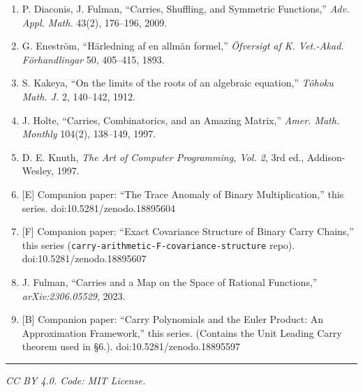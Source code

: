 \documentclass[
  11pt,
]{article}
\providecommand{\tightlist}{%
  \setlength{\itemsep}{0pt}\setlength{\parskip}{0pt}}
\begin{document}
\begin{enumerate}
\def\labelenumi{\arabic{enumi}.}
\tightlist
\item
  P. Diaconis, J. Fulman, ``Carries, Shuffling, and Symmetric Functions,''
  \emph{Adv. Appl. Math.} 43(2), 176--196, 2009.
\item
  G. Eneström, ``Härledning af en allmän formel,'' \emph{Öfversigt af K.
  Vet.-Akad. Förhandlingar} 50, 405--415, 1893.
\item
  S. Kakeya, ``On the limits of the roots of an algebraic equation,''
  \emph{Tôhoku Math. J.} 2, 140--142, 1912.
\item
  J. Holte, ``Carries, Combinatorics, and an Amazing Matrix,'' \emph{Amer. Math.
  Monthly} 104(2), 138--149, 1997.
\item
  D. E. Knuth, \emph{The Art of Computer Programming, Vol. 2}, 3rd ed.,
  Addison-Wesley, 1997.
\item
  {[}E{]} Companion paper: ``The Trace Anomaly of Binary Multiplication,'' this
  series. doi:10.5281/zenodo.18895604
\item
  {[}F{]} Companion paper: ``Exact Covariance Structure of Binary Carry
  Chains,'' this series (\texttt{carry-arithmetic-F-covariance-structure} repo).
  doi:10.5281/zenodo.18895607
\item
  J. Fulman, ``Carries and a Map on the Space of Rational Functions,''
  \emph{arXiv:2306.05529}, 2023.
\item
  {[}B{]} Companion paper: ``Carry Polynomials and the Euler Product: An
  Approximation Framework,'' this series. (Contains the Unit Leading Carry
  theorem used in §6.). doi:10.5281/zenodo.18895597
\end{enumerate}

\begin{center}\rule{0.5\linewidth}{0.5pt}\end{center}

\emph{CC BY 4.0. Code: MIT License.}
\end{document}
